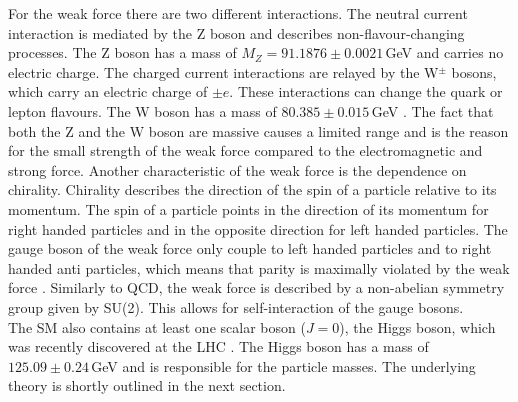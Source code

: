 \noindent For the weak force there are two different interactions. The neutral current interaction is mediated by the Z boson and describes non-flavour-changing processes. The Z boson has a mass of $M_Z=91.1876 \pm 0.0021$\,GeV \cite{SMmasses} and carries no electric charge. The charged current interactions are relayed by the W$^\pm$ bosons, which carry an electric charge of $\pm e$. These interactions can change the quark or lepton flavours. The W boson has a mass of $80.385 \pm 0.015$\,GeV \cite{SMmasses}. The fact that both the Z and the W boson are massive causes a limited range and is the reason for the small strength of the weak force compared to the electromagnetic and strong force. Another characteristic of the weak force is the dependence on chirality. Chirality describes the direction of the spin of a particle relative to its momentum. The spin of a particle points in the direction of its momentum for right handed particles and in the opposite direction for left handed particles. The gauge boson of the weak force only couple to left handed particles and to right handed anti particles, which means that parity is maximally violated by the weak force \cite{wu}. Similarly to QCD, the weak force is described by a non-abelian symmetry group given by SU(2). This allows for self-interaction of the gauge bosons.\\

\noindent The SM also contains at least one scalar boson ($J=0$), the Higgs boson, which was recently discovered at the LHC \cite{cms_higgsdiscov,atlas_higgsdiscov}. The Higgs boson has a mass of $125.09 \pm 0.24$\,GeV and is responsible for the particle masses. The underlying theory is shortly outlined in the next section.\\

